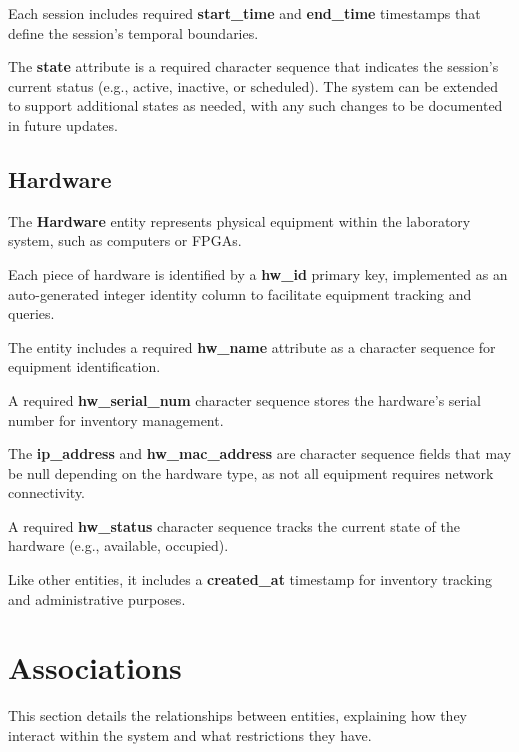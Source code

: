 \documentclass[a4paper,twoside,11pt]{article}
\begin{document}
Each session includes required \textbf{start\_time} and \textbf{end\_time} timestamps that define the session's temporal boundaries.

The \textbf{state} attribute is a required character sequence that indicates the session's current status (e.g., active, inactive, or scheduled). The system can be extended to support additional states as needed, with any such changes to be documented in future updates.

\subsection{Hardware}
The \textbf{Hardware} entity represents physical equipment within the laboratory system, such as computers or FPGAs.

Each piece of hardware is identified by a \textbf{hw\_id} primary key, implemented as an auto-generated integer identity column to facilitate equipment tracking and queries.

The entity includes a required \textbf{hw\_name} attribute as a character sequence for equipment identification.

A required \textbf{hw\_serial\_num} character sequence stores the hardware's serial number for inventory management.

The \textbf{ip\_address} and \textbf{hw\_mac\_address} are character sequence fields that may be null depending on the hardware type, as not all equipment requires network connectivity.

A required \textbf{hw\_status} character sequence tracks the current state of the hardware (e.g., available, occupied).

Like other entities, it includes a \textbf{created\_at} timestamp for inventory tracking and administrative purposes.

\section{Associations}
This section details the relationships between entities, explaining how they interact within the system and what restrictions they have.
\end{document}
